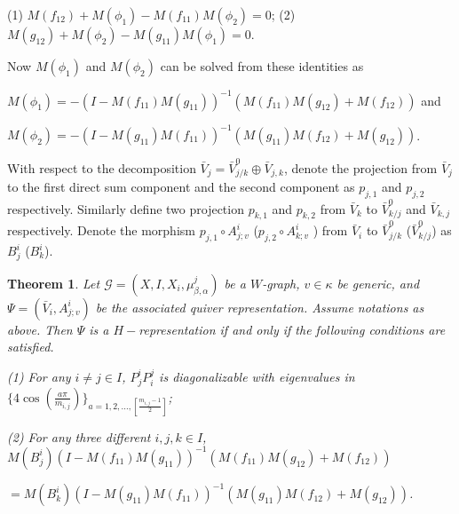 \def\CTEXPreproc{Created by ctex v0.2.12, don't edit!}\documentclass[11pt]{article}
\newtheorem{thm}{Theorem}[section]
\begin{document}
(1) $ M( f_{12}) + M(\phi_1) - M(f_{11})M( \phi_2)  =0  $;  (2)  $ M( g_{12}) + M(\phi_2) - M(g_{11})M( \phi_1)  =0  $.

Now $M( \phi_1 )$ and $ M(\phi_2 )  $ can  be solved from these identities as

$ M( \phi_1 ) = -( I - M(f_{11}) M( g_{11} )   )^{-1} ( M(  f_{11} )M( g_{12} ) +M( f_{12})  )   $ and

$M( \phi_2 ) = -( I - M(g_{11}) M( f_{11} )   )^{-1} ( M(  g_{11} )M( f_{12} ) +M( g_{12})  )   $.

With respect to the decomposition $\bar{V}_j =  \bar{V}^0 _{j/k} \oplus \bar{V}_{j,k}   $, denote the projection from
 $\bar{V}_j $ to the first direct sum component and the second component as $p_{j,1}  $ and $ p_{j,2}  $ respectively.
  Similarly  define two projection $p_{k,1}$ and $p_{k,2} $ from $\bar{V}_{k}$ to $\bar{V}^0 _{k/j}$ and $\bar{V}_{k,j}$ respectively.
  Denote the morphism $p_{j,1} \circ A^i _{j;v} $ ($p_{j,2} \circ A^i _{k;v} $    ) from $\bar{V}_i$ to $ \bar{V}^0 _{j/k}  $  ($ \bar{V}^0 _{k/j}  $)  as $B^i _j $ ($B^i _k $).


\begin{thm} Let  $\mathcal{G}=(X, I, X_i , \mu^j _{\beta ,\alpha} ) $ be a $W$-graph, $v\in \kappa$ be generic, and  $\Psi=(\bar{V}_i , A^i _{j;v})$ be the associated quiver representation. Assume notations as above. Then $\Psi$ is a $H-$representation if and only if the following conditions are satisfied.

\noindent (1)  For any $i\neq j \in I$, $P^i _j  P^j _i $ is diagonalizable  with eigenvalues in $\{ 4\cos ( \frac{a\pi}{m_{i,j} } ) \} _{a=1,2,...,[\frac{m_{i,j}-1}{2}]   } $;

\noindent (2) For any three different $i,j,k\in I$,
$ M( B^i _j )( I - M(f_{11}) M( g_{11} )   )^{-1} ( M(  f_{11} )M( g_{12} ) +M( f_{12})  )$

$ = M(B^i _k ) ( I - M(g_{11}) M( f_{11} )   )^{-1} ( M(  g_{11} )M( f_{12} ) +M( g_{12})  ) $.

\end{thm}
\end{document}
